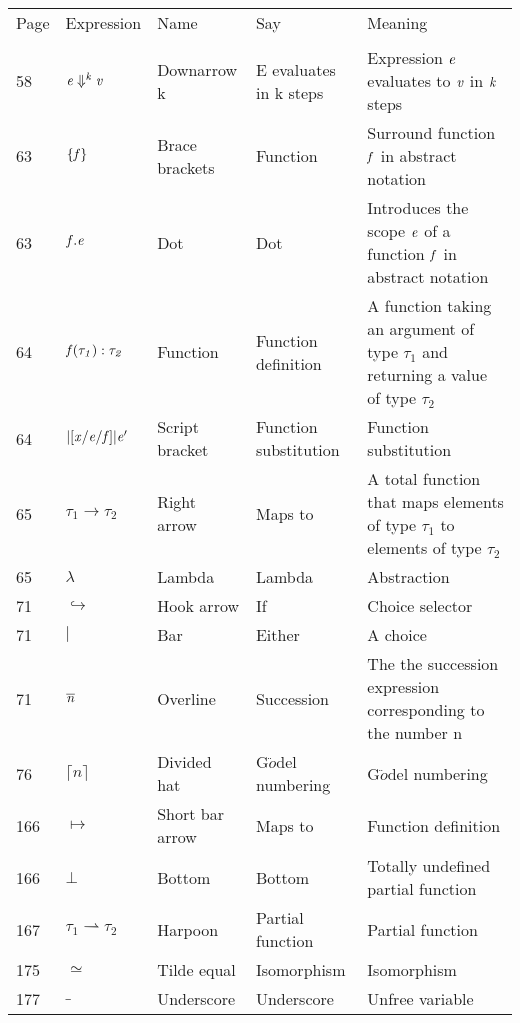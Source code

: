 \documentclass[12pt]{article}
\begin{document}
\begin{tabular}[b] {p{} p{} p{} p{} p{}}
Page & Expression & Name & Say & Meaning \\ \\

58 & $\it{e} \Downarrow ^{\it{k}}\it{v}$  & Downarrow k & E evaluates in k steps & Expression $ \it{e}$ evaluates to $\it{v}$ in $\it{k}$ steps\\

63 & $\{\it{f}\}$ & Brace brackets & Function & Surround function $\it{f}$ in abstract notation \\

63 & $\it{f}.\it{e}$ & Dot & Dot & Introduces the scope $\it{e}$ of a function $\it{f}$ in abstract notation \\
64 & $\it{f}(\tau_1):\tau_2$ & Function & Function definition & A function taking an argument of type $\tau_1$ and returning a value of type $\tau_2$ \\

64 & $\mathcal{|[}\it{x/e/f}\mathcal{]|}\it{e'}$ & Script bracket & Function substitution & Function substitution \\

65 & $\tau_1 \to \tau_2$ & Right arrow & Maps to & A total function that maps elements of type $\tau_1$ to elements of type $\tau_2$ \\
65 & $\lambda $ & Lambda & Lambda & Abstraction \\
71 & $\hookrightarrow$ & Hook arrow & If & Choice selector \\
71 & $|$ & Bar & Either & A choice \\
71 & $\overline{\it{n}}$ & Overline & Succession & The the succession expression corresponding to the number n \\
76 & $\lceil n \rceil$ & Divided hat & G$\ddot{o}$del numbering & G$\ddot{o}$del numbering \\

166 & $\mapsto$ & Short bar arrow & Maps to & Function definition \\
166 &$ \bot$ & Bottom & Bottom & Totally undefined partial function \\
167 & $\tau_1 \rightharpoonup \tau_2$ & Harpoon & Partial function & Partial function \\
175 & $ \simeq $ & Tilde equal & Isomorphism & Isomorphism \\
177 & $\_$ & Underscore & Underscore & Unfree variable \\

\end{tabular}
\end{document}
